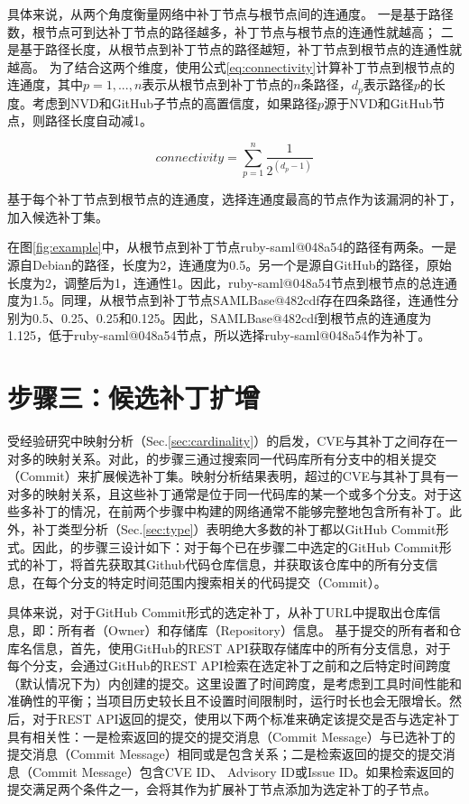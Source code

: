 具体来说，\tool 从两个角度衡量网络中补丁节点与根节点间的连通度。 一是基于路径数，根节点可到达补丁节点的路径越多，补丁节点与根节点的连通性就越高； 二是基于路径长度，从根节点到补丁节点的路径越短，补丁节点到根节点的连通性就越高。 为了结合这两个维度，\tool 使用公式\ref{eq:connectivity}计算补丁节点到根节点的连通度，其中$ p = 1, ..., n$表示从根节点到补丁节点的$n$条路径，$d_p$表示路径$p$的长度。考虑到NVD和GitHub子节点的高置信度，如果路径$p$源于NVD和GitHub节点，则路径长度自动减1。

\begin{equation}\label{eq:connectivity}
    connectivity =\sum_{p=1}^{n}   \frac{1}{2^{({d}_{p} -1)}}
\end{equation}

基于每个补丁节点到根节点的连通度，\tool 选择连通度最高的节点作为该漏洞的补丁，加入候选补丁集。

\begin{exmp}
在图\ref{fig:example}中，从根节点到补丁节点ruby-saml@048a54的路径有两条。一是源自Debian的路径，长度为2，连通度为0.5。另一个是源自GitHub的路径，原始长度为2，调整后为1，连通性1。因此，ruby-saml@048a54节点到根节点的总连通度为1.5。同理，从根节点到补丁节点SAMLBase@482cdf存在四条路径，连通性分别为0.5、0.25、0.25和0.125。因此，SAMLBase@482cdf到根节点的连通度为1.125，低于ruby-saml@048a54节点，所以\tool 选择ruby-saml@048a54作为补丁。%
\end{exmp}


\section{步骤三：候选补丁扩增}
受经验研究中映射分析（Sec.\ref{sec:cardinality}）的启发，CVE与其补丁之间存在一对多的映射关系。对此，\tool 的步骤三通过搜索同一代码库所有分支中的相关提交（Commit）来扩展候选补丁集。映射分析结果表明，超过的CVE与其补丁具有一对多的映射关系，且这些补丁通常是位于同一代码库的某一个或多个分支。对于这些多补丁的情况，\tool 在前两个步骤中构建的网络通常不能够完整地包含所有补丁。此外，补丁类型分析（Sec.\ref{sec:type}）表明绝大多数的补丁都以GitHub Commit形式。因此，\tool 的步骤三设计如下：对于每个已在步骤二中选定的GitHub Commit形式的补丁，\tool 将首先获取其Github代码仓库信息，并获取该仓库中的所有分支信息，在每个分支的特定时间范围内搜索相关的代码提交（Commit）。

具体来说，对于GitHub Commit形式的选定补丁，\tool 从补丁URL中提取出仓库信息，即：所有者（Owner）和存储库（Repository）信息。
基于提交的所有者和仓库名信息，首先，\tool 使用GitHub的REST API\cite{github-api-2}获取存储库中的所有分支信息，对于每个分支，\tool 会通过GitHub的REST API\cite{github-api-3}检索在选定补丁之前和之后特定时间跨度（默认情况下为）内创建的提交。这里设置了时间跨度，是考虑到工具时间性能和准确性的平衡；当项目历史较长且不设置时间限制时，\tool 运行时长也会无限增长。然后，对于REST API返回的提交，\tool 使用以下两个标准来确定该提交是否与选定补丁具有相关性：一是检索返回的提交的提交消息（Commit Message）与已选补丁的提交消息（Commit Message）相同或是包含关系；二是检索返回的提交的提交消息（Commit Message）包含CVE ID、 Advisory ID或Issue ID。如果检索返回的提交满足两个条件之一，\tool 会将其作为扩展补丁节点添加为选定补丁的子节点。

